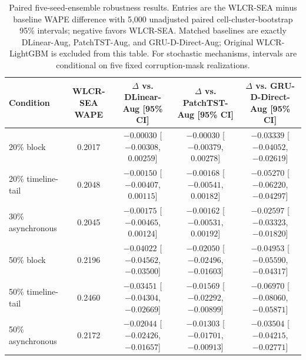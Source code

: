 \documentclass[10pt,conference,letterpaper]{IEEEtran}
\newcommand{\method}{WLCR-SEA}
\newcommand{\originalmethod}{Original WLCR-LightGBM}
\begin{document}
\begin{table}[t]
\centering
\caption{Paired five-seed-ensemble robustness results. Entries are the \method{} minus baseline WAPE difference with 5,000 unadjusted paired cell-cluster-bootstrap 95\% intervals; negative favors \method{}. Matched baselines are exactly DLinear-Aug, PatchTST-Aug, and GRU-D-Direct-Aug; \originalmethod{} is excluded from this table. For stochastic mechanisms, intervals are conditional on five fixed corruption-mask realizations.}
\label{tab:robust-ci}
\footnotesize
\setlength{\tabcolsep}{3.0pt}
\begin{tabular}{lcccc}
\toprule
Condition & \method{} WAPE & \shortstack{$\Delta$ vs.\\DLinear-Aug [95\% CI]} & \shortstack{$\Delta$ vs.\\PatchTST-Aug [95\% CI]} & \shortstack{$\Delta$ vs.\\GRU-D-Direct-Aug [95\% CI]}\\
\midrule
20\% block & 0.2017 & $-0.00030$ [$-0.00308$, $0.00259$] & $-0.00030$ [$-0.00379$, $0.00278$] & $-0.03339$ [$-0.04052$, $-0.02619$]\\
20\% timeline-tail & 0.2048 & $-0.00150$ [$-0.00407$, $0.00115$] & $-0.00168$ [$-0.00541$, $0.00182$] & $-0.05270$ [$-0.06220$, $-0.04297$]\\
30\% asynchronous & 0.2045 & $-0.00175$ [$-0.00465$, $0.00124$] & $-0.00162$ [$-0.00531$, $0.00192$] & $-0.02597$ [$-0.03323$, $-0.01820$]\\
50\% block & 0.2196 & $-0.04022$ [$-0.04562$, $-0.03500$] & $-0.02050$ [$-0.02496$, $-0.01603$] & $-0.04953$ [$-0.05590$, $-0.04317$]\\
50\% timeline-tail & 0.2460 & $-0.03451$ [$-0.04304$, $-0.02669$] & $-0.01569$ [$-0.02292$, $-0.00899$] & $-0.06970$ [$-0.08060$, $-0.05871$]\\
50\% asynchronous & 0.2172 & $-0.02044$ [$-0.02426$, $-0.01657$] & $-0.01303$ [$-0.01701$, $-0.00913$] & $-0.03504$ [$-0.04215$, $-0.02771$]\\
\bottomrule
\end{tabular}
\end{table}
\end{document}
